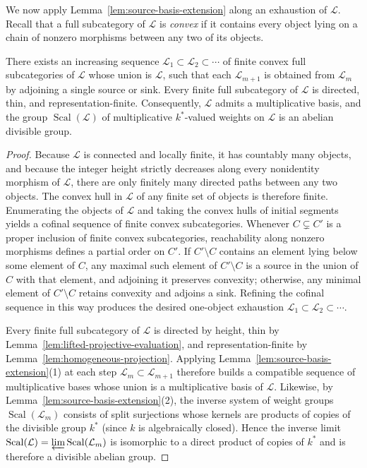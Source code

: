 We now apply Lemma~\ref{lem:source-basis-extension} along an exhaustion of
$\mathcal L$. Recall that a full subcategory of $\mathcal L$ is \emph{convex}
if it contains every object lying on a chain of nonzero morphisms between any
two of its objects.

\begin{lemma}
\label{lem:cover-exhaustion}
There exists an increasing sequence $\mathcal L_1\subset\mathcal L_2\subset\cdots$
of finite convex full subcategories of $\mathcal L$ whose union is
$\mathcal L$, such that each $\mathcal L_{m+1}$ is obtained from
$\mathcal L_m$ by adjoining a single source or sink. Every finite full
subcategory of $\mathcal L$ is directed, thin, and representation-finite.
Consequently, $\mathcal L$ admits a multiplicative basis, and the group
$\operatorname{Scal}(\mathcal L)$ of multiplicative $k^*$-valued weights on
$\mathcal L$ is an abelian divisible group.
\end{lemma}
\begin{proof}
Because $\mathcal L$ is connected and locally finite, it has countably many
objects, and because the integer height strictly decreases along every
nonidentity morphism of $\mathcal L$, there are only finitely many directed
paths between any two objects. The convex hull in $\mathcal L$ of any finite
set of objects is therefore finite. Enumerating the objects of $\mathcal L$
and taking the convex hulls of initial segments yields a cofinal sequence of
finite convex subcategories. Whenever $C\subsetneq C'$ is a proper inclusion
of finite convex subcategories, reachability along nonzero morphisms defines
a partial order on $C'$. If $C'\setminus C$ contains an element lying below
some element of $C$, any maximal such element of $C'\setminus C$ is a source
in the union of $C$ with that element, and adjoining it preserves convexity;
otherwise, any minimal element of $C'\setminus C$ retains convexity and
adjoins a sink. Refining the cofinal sequence in this way produces the
desired one-object exhaustion $\mathcal L_1\subset\mathcal L_2\subset\cdots$.

Every finite full subcategory of $\mathcal L$ is directed by height, thin by
Lemma~\ref{lem:lifted-projective-evaluation}, and representation-finite by
Lemma~\ref{lem:homogeneous-projection}. Applying
Lemma~\ref{lem:source-basis-extension}(1) at each step $\mathcal L_m\subset\mathcal L_{m+1}$
therefore builds a compatible sequence of multiplicative bases whose union is
a multiplicative basis of $\mathcal L$. Likewise, by
Lemma~\ref{lem:source-basis-extension}(2), the inverse system of weight groups
$\operatorname{Scal}(\mathcal L_m)$ consists of split surjections whose
kernels are products of copies of the divisible group $k^*$ (since $k$ is
algebraically closed). Hence the inverse limit
$\operatorname{Scal}(\mathcal L)=\varprojlim\operatorname{Scal}(\mathcal L_m)$
is isomorphic to a direct product of copies of $k^*$ and is therefore a
divisible abelian group.
\end{proof}

